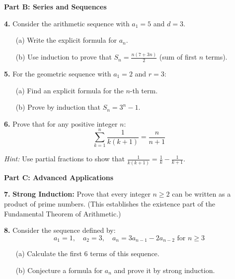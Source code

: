 \documentclass[12pt]{article}
\begin{document}
\textbf{Part B: Series and Sequences}

\textbf{4.} Consider the arithmetic sequence with $a_1 = 5$ and $d = 3$.

\begin{enumerate}
\item[(a)] Write the explicit formula for $a_n$.
\vspace{2cm}

\item[(b)] Use induction to prove that $S_n = \frac{n(7 + 3n)}{2}$ (sum of first $n$ terms).
\vspace{4cm}
\end{enumerate}

\textbf{5.} For the geometric sequence with $a_1 = 2$ and $r = 3$:

\begin{enumerate}
\item[(a)] Find an explicit formula for the $n$-th term.
\vspace{2cm}

\item[(b)] Prove by induction that $S_n = 3^n - 1$.
\vspace{4cm}
\end{enumerate}

\textbf{6.} Prove that for any positive integer $n$:
$$\sum_{k=1}^{n} \frac{1}{k(k+1)} = \frac{n}{n+1}$$

\textit{Hint:} Use partial fractions to show that $\frac{1}{k(k+1)} = \frac{1}{k} - \frac{1}{k+1}$.
\vspace{5cm}

\textbf{Part C: Advanced Applications}

\textbf{7.} \textbf{Strong Induction:} Prove that every integer $n \geq 2$ can be written as a product of prime numbers. (This establishes the existence part of the Fundamental Theorem of Arithmetic.)
\vspace{5cm}

\textbf{8.} Consider the sequence defined by:
$$a_1 = 1, \quad a_2 = 3, \quad a_n = 3a_{n-1} - 2a_{n-2} \text{ for } n \geq 3$$

\begin{enumerate}
\item[(a)] Calculate the first 6 terms of this sequence.
\vspace{3cm}

\item[(b)] Conjecture a formula for $a_n$ and prove it by strong induction.
\vspace{5cm}
\end{enumerate}
\end{document}
